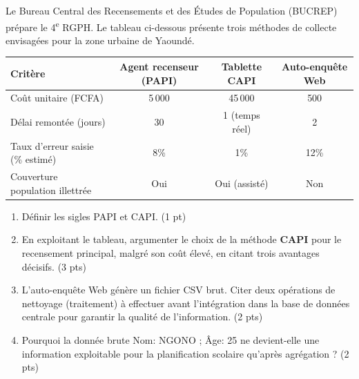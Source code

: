 \documentclass[11pt]{article}
\begin{document}
\begin{exercice}
Le Bureau Central des Recensements et des Études de Population (BUCREP) prépare le 4\textsuperscript{e} RGPH. Le tableau ci-dessous présente trois méthodes de collecte envisagées pour la zone urbaine de Yaoundé.

\begin{tabular}{|l|c|c|c|}
\hline
\textbf{Critère} & \textbf{Agent recenseur (PAPI)} & \textbf{Tablette CAPI} & \textbf{Auto-enquête Web} \\
\hline
Coût unitaire (FCFA) & 5\,000 & 45\,000 & 500 \\
Délai remontée (jours) & 30 & 1 (temps réel) & 2 \\
Taux d'erreur saisie (\% estimé) & 8\% & 1\% & 12\% \\
Couverture population illettrée & Oui & Oui (assisté) & Non \\
\hline
\end{tabular}

\begin{enumerate}
    \item Définir les sigles PAPI et CAPI. \hfill (1 pt)
    \item En exploitant le tableau, argumenter le choix de la méthode \textbf{CAPI} pour le recensement principal, malgré son coût élevé, en citant trois avantages décisifs. \hfill (3 pts)
    \item L'auto-enquête Web génère un fichier CSV brut. Citer deux opérations de \og nettoyage\fg{} (traitement) à effectuer avant l'intégration dans la base de données centrale pour garantir la qualité de l'information. \hfill (2 pts)
    \item Pourquoi la \og donnée\fg{} brute \og Nom: NGONO ; Âge: 25 \fg{} ne devient-elle une \og information\fg{} exploitable pour la planification scolaire qu'après agrégation ? \hfill (2 pts)
\end{enumerate}
\end{exercice}
\end{document}

